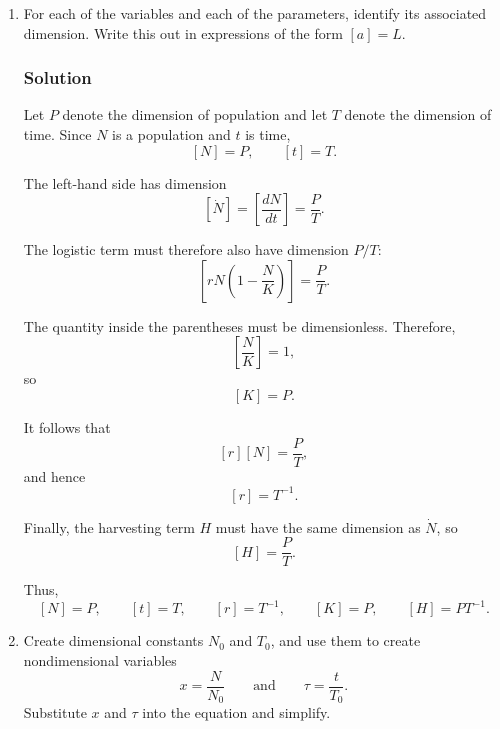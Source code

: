 \documentclass[12pt]{amsart}
\theoremstyle{conjecture}
\theoremstyle{definition}
\theoremstyle{question}
\theoremstyle{theorem}
\begin{document}
    \begin{enumerate}[label=(\alph*)]

        \item
        For each of the variables and each of the parameters, identify its
        associated dimension. Write this out in expressions of the form
        \([a]=L\).

        \subsubsection*{Solution}

        Let \(P\) denote the dimension of population and let \(T\) denote the
        dimension of time. Since \(N\) is a population and \(t\) is time,
        \[
            [N]=P,
            \qquad
            [t]=T.
        \]

        The left-hand side has dimension
        \[
            [\dot N]
            =
            \left[\frac{dN}{dt}\right]
            =
            \frac{P}{T}.
        \]

        The logistic term must therefore also have dimension \(P/T\):
        \[
            \left[
                rN\left(1-\frac{N}{K}\right)
            \right]
            =
            \frac{P}{T}.
        \]

        The quantity inside the parentheses must be dimensionless. Therefore,
        \[
            \left[\frac{N}{K}\right]=1,
        \]
        so
        \[
            [K]=P.
        \]

        It follows that
        \[
            [r][N]=\frac{P}{T},
        \]
        and hence
        \[
            [r]=T^{-1}.
        \]

        Finally, the harvesting term \(H\) must have the same dimension as
        \(\dot N\), so
        \[
            [H]=\frac{P}{T}.
        \]

        Thus,
        \[
            \boxed{
                [N]=P,\qquad
                [t]=T,\qquad
                [r]=T^{-1},\qquad
                [K]=P,\qquad
                [H]=PT^{-1}.
            }
        \]

        \item
        Create dimensional constants \(N_0\) and \(T_0\), and use them to
        create nondimensional variables
        \[
            x=\frac{N}{N_0}
            \qquad\text{and}\qquad
            \tau=\frac{t}{T_0}.
        \]
        Substitute \(x\) and \(\tau\) into the equation and simplify.


\end{enumerate}
\end{document}
